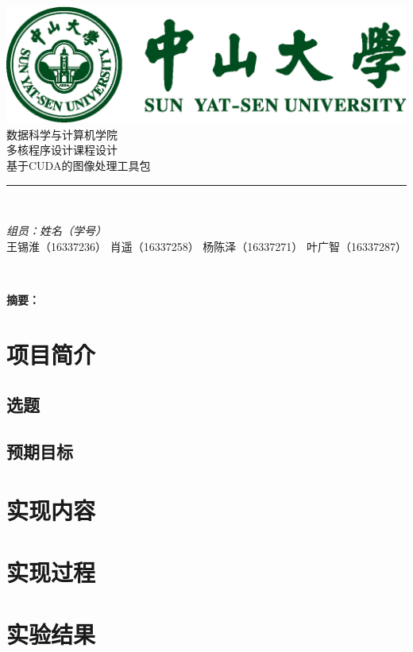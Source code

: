 \documentclass[12pt,AutoFakeBold]{ctexart}
\begin{document}
    \begin{titlepage}
        \centering
        \vspace*{0.5 cm}
        \includegraphics[scale = 0.5]{img/SYSULogo.png}\\[1.0 cm] %
        \textsc{\LARGE 数据科学与计算机学院}\\[0.2 cm]
        \textsc{\Large 多核程序设计课程设计}\\[0.2 cm]
        \textsc{\large 基于CUDA的图像处理工具包}\\[0.2 cm]
        \rule{\linewidth}{0.2 mm} \\[0.4 cm]
        { \huge \bfseries}
        
        \begin{minipage}{0.4\textwidth}
                \begin{flushright} 
                \emph{组员：姓名（学号）} \\
                王锡淮（16337236）\linebreak
                肖遥（16337258）\linebreak
                杨陈泽（16337271）\linebreak
                叶广智（16337287）\linebreak
            \end{flushright}
        \end{minipage}\\[2 cm]
        \vfill
        
    \end{titlepage}




\tableofcontents
\newpage

\textbf{摘要：}

\section{项目简介}

\subsection{选题}

\subsection{预期目标}


\section{实现内容}

\section{实现过程}

\section{实验结果}

\renewcommand\refname{参考文献} 
% 
\end{document}
